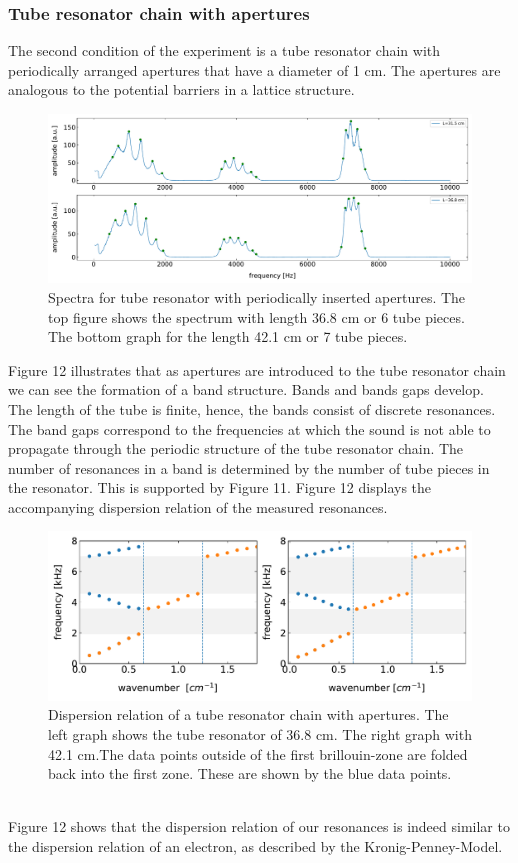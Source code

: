 \documentclass[12pt]{article}
\begin{document}
\subsubsection{Tube resonator chain with apertures}
The second condition of the experiment is a tube resonator chain with periodically arranged apertures that have a diameter of 1 cm. The apertures are analogous to the potential barriers in a lattice structure. 
\begin{figure}[hbt]
	\caption{Spectra for tube resonator with periodically inserted apertures. The top figure shows the spectrum with length 36.8 cm or 6 tube pieces. The bottom graph for the length 42.1 cm or 7 tube pieces.}
	\includegraphics[width=.7\textwidth]{results/spectra_with_aperture}	
\end{figure}
Figure 12 illustrates that as apertures are introduced to the tube resonator chain we can see the formation of a band structure. Bands and bands gaps develop. The length of the tube is finite, hence, the bands consist of discrete resonances. The band gaps correspond to the frequencies at which the sound is not able to propagate through the periodic structure of the tube resonator chain.
The number of resonances in a band is determined by the number of tube pieces in the resonator. This is supported by Figure 11. Figure 12 displays the accompanying dispersion relation of the measured resonances. 
\begin{figure}[hbt]
	\caption{Dispersion relation of a tube resonator chain with apertures. The left graph shows the tube resonator of 36.8 cm. The right graph with 42.1 cm.The data points outside of the first brillouin-zone are folded back into the first zone. These are shown by the blue data points.}
	\includegraphics[width=.7\textwidth]{results/band_structure_graph}
\end{figure}
\\
Figure 12 shows that the dispersion relation of our resonances is indeed similar to the dispersion relation of an electron, as described by the Kronig-Penney-Model. 
\end{document}
